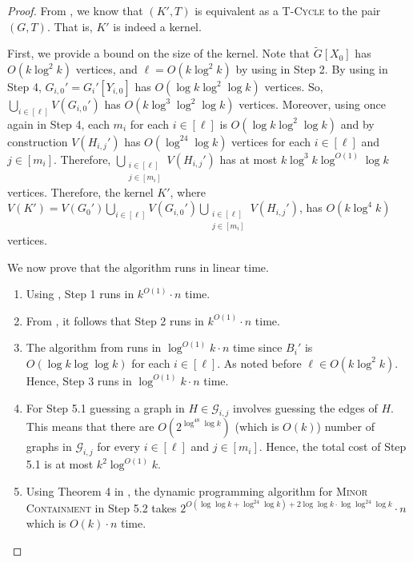 \documentclass{article}
\numberwithin{claimcounter}{lemma}
\begin{document}
\mainKernel*
\begin{proof}
    From , we know that $(K',T)$ is equivalent as a \textsc{T-Cycle} to the pair $(G,T)$. That is, $K'$ is indeed a kernel.

    First, we provide a bound on the size of the kernel.
    Note that $\tilde{G}[X_0]$  has  $O(k \log^2 k)$ vertices, and $\ell = O(k \log^2 k)$ by using  in Step 2. 
    By using  in Step 4, $G_{i,0}' = G_i'[Y_{i,0}]$ has $O(\log k \log^2 \log k)$ vertices. So, $\bigcup_{i\in [\ell]}V(G_{i,0}')$ has $O(k \log^3 \log^2 \log k)$ vertices. 
    Moreover, using   once again in Step 4, each $m_i$ for each $i\in [\ell]$ is  $O(\log k \log^2 \log k)$ and by construction $V(H_{i,j}')$ has $O(\log^{24} \log k)$ vertices for each $i\in [\ell]$ and $j\in [m_i]$. Therefore, $\bigcup_{\substack{i\in [\ell] \\ j\in [m_i]}} V(H_{i,j}')$ has  at most $k \log^3 k \log^{O(1)}\log k$ vertices. 
    Therefore, the kernel $K'$, where $V(K') = V(G_0') \bigcup_{i\in [\ell]} V(G_{i,0}') \bigcup_{\substack{i\in [\ell] \\ j\in [m_i]}} V(H_{i,j}') $, has  $O(k \log^4 k)$ vertices.

    We now prove that the algorithm runs in linear time. 
    \begin{enumerate}[(1.)]
        \item Using , Step 1 runs in $k^{O(1)} \cdot n $ time.
        \item From , it follows that Step 2 runs in $k^{O(1)}\cdot n$ time.
        \item The algorithm from  runs in $\log^{O(1)}k  \cdot n $ time since $B_i'$ is  $ O(\log k\log \log k)$ for each $i \in [\ell]$. As noted before $\ell\in O(k \log^2 k)$. Hence, Step 3 runs in $\log^{O(1)}k  \cdot n $ time. 
        \item For Step 5.1 guessing a graph in $H \in \mathcal{G}_{i,j}$ involves guessing the edges of $H$. This means that there are  $O(2^{\log^{48}\log k})$ (which is $O(k)$) number of graphs in $\mathcal{G}_{i,j}$  for every $i \in [\ell]$ and $j \in [m_i]$. Hence, the total cost of Step 5.1 is at most $k^2\log^{O(1)}k $.
        \item Using Theorem 4 in \cite{adlertwo}, the dynamic programming algorithm for \textsc{Minor Containment} in Step 5.2 takes $2^{O(\log\log k+\log^{24}\log k)+2\log\log k\cdot\log\log^{24}\log k}\cdot n$ which is $O(k) \cdot  n$ time. 


\end{enumerate}
\end{proof}
\end{document}
